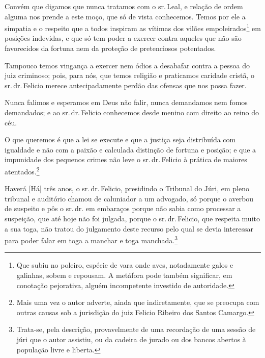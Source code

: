 Convém que digamos que nunca tratamos com o sr.\,Leal, e relação de ordem
alguma nos prende a este moço, que só de vista conhecemos. Temos por ele
a simpatia e o respeito que a todos inspiram as vítimas dos vilões
empoleirados\footnote{ Que subiu no poleiro, espécie de vara onde aves,
  notadamente galos e galinhas, sobem e repousam. A metáfora pode também
  significar, em conotação pejorativa, alguém incompetente investido de
  autoridade.} em posições indevidas, e que só tem poder a exercer
contra aqueles que não são favorecidos da fortuna nem da proteção de
pretenciosos potentados.

Tampouco temos vingança a exercer nem ódios a desabafar contra a pessoa
do juiz criminoso; pois, para nós, que temos religião e praticamos
caridade cristã, o sr.\,dr.\,Felicio merece antecipadamente perdão das
ofensas que nos possa fazer.

Nunca falimos e esperamos em Deus não falir, nunca demandamos nem fomos
demandados; e ao sr.\,dr.\,Felicio conhecemos desde menino com direito ao
reino do céu.

O que queremos é que a lei se execute e que a justiça seja distribuída
com igualdade e não com a paixão e calculada distinção de fortuna e
posição; e que a impunidade dos pequenos crimes não leve o sr.\,dr.\,Felicio à prática de maiores atentados.\footnote{ Mais uma vez o autor
  adverte, ainda que indiretamente, que se preocupa com outras causas
  sob a jurisdição do juiz Felicio Ribeiro dos Santos Camargo.}

Haverá {[}Há{]} três anos, o sr.\,dr.\,Felicio, presidindo o Tribunal do
Júri, em pleno tribunal e auditório chamou de caluniador a um advogado,
só porque o averbou de suspeito e pôs o sr.\,dr. em embaraços porque não
sabia como processar a suspeição, que até hoje não foi julgada, porque o
sr.\,dr.\,Felicio, que respeita muito a sua toga, não tratou do julgamento
deste recurso pelo qual se devia interessar para poder falar em toga a
manchar e toga manchada.\footnote{ Trata-se, pela descrição,
  provavelmente de uma recordação de uma sessão de júri que o autor
  assistiu, ou da cadeira de jurado ou dos bancos abertos à população
  livre e liberta.}

